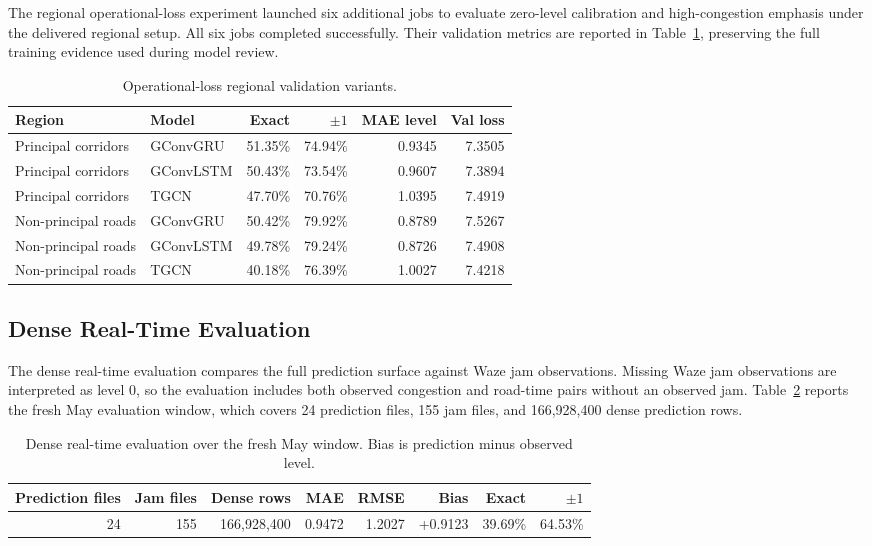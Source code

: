 \documentclass[11pt, a4paper]{article}
\begin{document}
The regional operational-loss experiment launched six additional jobs to evaluate zero-level calibration and high-congestion emphasis under the delivered regional setup. All six jobs completed successfully. Their validation metrics are reported in Table~\ref{tab:oploss-validation-summary}, preserving the full training evidence used during model review.

\begin{table}[htbp]
\centering
\caption{Operational-loss regional validation variants.}
\label{tab:oploss-validation-summary}
{%
\begin{tabular}{llrrrr}
\hline
Region & Model & Exact & $\pm1$ & MAE level & Val loss \\
\hline
Principal corridors & GConvGRU & 51.35\% & 74.94\% & 0.9345 & 7.3505 \\
Principal corridors & GConvLSTM & 50.43\% & 73.54\% & 0.9607 & 7.3894 \\
Principal corridors & TGCN & 47.70\% & 70.76\% & 1.0395 & 7.4919 \\
Non-principal roads & GConvGRU & 50.42\% & 79.92\% & 0.8789 & 7.5267 \\
Non-principal roads & GConvLSTM & 49.78\% & 79.24\% & 0.8726 & 7.4908 \\
Non-principal roads & TGCN & 40.18\% & 76.39\% & 1.0027 & 7.4218 \\
\hline
\end{tabular}%
}
\end{table}

\subsection{Dense Real-Time Evaluation}

The dense real-time evaluation compares the full prediction surface against Waze jam observations. Missing Waze jam observations are interpreted as level 0, so the evaluation includes both observed congestion and road-time pairs without an observed jam. Table~\ref{tab:may-dense-overall-full} reports the fresh May evaluation window, which covers 24 prediction files, 155 jam files, and 166,928,400 dense prediction rows.

\begin{table}[htbp]
\centering
\caption{Dense real-time evaluation over the fresh May window. Bias is prediction minus observed level.}
\label{tab:may-dense-overall-full}
{%
\begin{tabular}{rrrrrrrr}
\hline
Prediction files & Jam files & Dense rows & MAE & RMSE & Bias & Exact & $\pm1$ \\
\hline
24 & 155 & 166,928,400 & 0.9472 & 1.2027 & +0.9123 & 39.69\% & 64.53\% \\
\hline
\end{tabular}%
}
\end{table}
\end{document}
